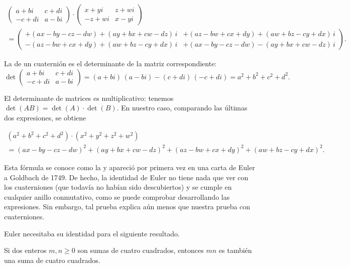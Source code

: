 \documentclass{article}
\numberwithin{equation}{section}
\begin{document}
\begin{multline*}
  \begin{pmatrix}
    a+bi & c+di\\
    -c + d i & a - bi
  \end{pmatrix}\cdot \begin{pmatrix}
    x+yi & z+wi\\
    -z + wi & x - yi
  \end{pmatrix} \\
  = \begin{pmatrix}
    +(a x - b y - c z - d w) + (a y + b x + c w - d z)\,i & +(a z - b w + c x + d y) + (a w + b z - c y + d x)\,i \\
    - (a z - b w + c x + d y) + (a w + b z - c y + d x)\,i & + (a x - b y - c z - d w) - (a y + b x + c w - d z)\,i
  \end{pmatrix}.
\end{multline*}

La  de un cuaternión es el determinante de la matriz
correspondiente:
\[ \det \begin{pmatrix}
    a+bi & c+di\\
    -c + d i & a - bi
  \end{pmatrix} = (a+bi)\,(a - bi) - (c+di)\,(-c+di) = a^2 + b^2 + c^2 + d^2. \]

El determinante de matrices es multiplicativo: tenemos
$\det (AB) = \det (A)\cdot \det (B)$. En nuestro caso, comparando las últimas
dos expresiones, se obtiene

\begin{multline*}
  (a^2 + b^2 + c^2 + d^2)\cdot (x^2 + y^2 + z^2 + w^2) \\
  = (a x - b y - c z - d w)^2 +
    (a y + b x + c w - d z)^2 +
    (a z - b w + c x + d y)^2 +
    (a w + b z - c y + d x)^2.
\end{multline*}

Esta fórmula se conoce como la 
y apareció por primera vez en una carta de Euler a Goldbach de 1749. De hecho,
la identidad de Euler no tiene nada que ver con los cuaterniones (que todavía no
habían sido descubiertos) y se cumple en cualquier anillo conmutativo, como se
puede comprobar desarrollando las expresiones. Sin embargo, tal prueba explica
aún menos que nuestra prueba con cuaterniones.

Euler necesitaba su identidad para el siguiente resultado.

\begin{lema*}
  Si dos enteros $m, n\ge 0$ son sumas de cuatro cuadrados, entonces $mn$ es
  también una suma de cuatro cuadrados.
\end{lema*}
\end{document}
